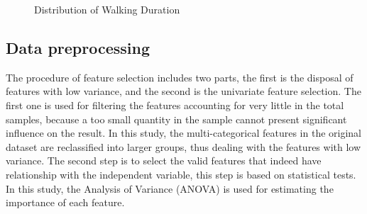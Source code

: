 \documentclass[sustainability,article,submit,moreauthors,pdftex,10pt,a4paper]{Definitions/mdpi}
\begin{document}
%
\begin{figure}[h]
	\caption{Distribution of Walking Duration}
	\label{fig:DurationDistribution}
	\centering
\end{figure}

\subsection{Data preprocessing}
The procedure of feature selection includes two parts, the first is the disposal of features with low variance, and the second is the univariate feature selection. The first one is used for filtering the features accounting for very little in the total samples, because a too small quantity in the sample cannot present significant influence on the result. In this study, the multi-categorical features in the original dataset are reclassified into larger groups, thus dealing with the features with low variance. The second step is to select the valid features that indeed have relationship with the independent variable, this step is based on statistical tests. In this study, the Analysis of Variance (ANOVA) is used for estimating the importance of each feature.
\end{document}
